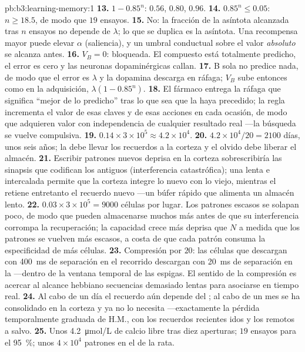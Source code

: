 \begin{solution}{pb:b3:learning-memory:1}
\textbf{13.} $1 - 0.85^{n}$: $0.56$, $0.80$, $0.96$.
\textbf{14.} $0.85^{n} \le 0.05$: $n \ge 18.5$, de modo que $19$ ensayos.
\textbf{15.} No: la fracción de la asíntota alcanzada tras $n$ ensayos
no depende de $\lambda$; lo que se duplica es la asíntota. Una
recompensa mayor puede elevar $\alpha$ (saliencia), y un umbral
conductual sobre el valor \emph{absoluto} se alcanza antes.
\textbf{16.} $V_{B} = 0$: bloqueada. El compuesto está totalmente
predicho, el error es cero y las neuronas dopaminérgicas callan.
\textbf{17.} B sola no predice nada, de modo que el error es $\lambda$ y
la dopamina descarga en ráfaga; $V_{B}$ sube entonces como en la
adquisición, $\lambda(1 -
0.85^{n})$.
\textbf{18.} El fármaco entrega la ráfaga que significa ``mejor de lo
predicho'' tras lo que sea que la haya precedido; la regla incrementa
el valor de esas claves y de esas acciones en cada ocasión, de modo que
adquieren valor con independencia de cualquier resultado real ---la
búsqueda se vuelve compulsiva.
\textbf{19.} $0.14\times 3\times 10^{5} \approx 4.2\times 10^{4}$.
\textbf{20.} $4.2\times 10^{4}/20 = 2100$ días, unos seis años; la
 debe llevar los recuerdos a la corteza y el olvido debe
liberar el almacén.
\textbf{21.} Escribir patrones nuevos deprisa en la corteza
sobrescribiría las sinapsis que codifican los antiguos (interferencia
catastrófica); una  lenta e intercalada permite que la
corteza integre lo nuevo con lo viejo, mientras el  retiene
entretanto el recuerdo nuevo ---un búfer rápido que alimenta un almacén
lento.
\textbf{22.} $0.03\times 3\times 10^{5} = 9000$ células por lugar. Los
patrones escasos se solapan poco, de modo que pueden almacenarse muchos
más antes de que su interferencia corrompa la recuperación; la
capacidad crece más deprisa que $N$ a medida que los patrones se
vuelven más escasos, a costa de que cada patrón consuma la
especificidad de más células.
\textbf{23.} Compresión por $20$: las células que descargan con
\qty{400}{ms} de separación en el recorrido descargan con \qty{20}{ms}
de separación en la  ---dentro de la ventana temporal de
las espigas. El sentido de la compresión es acercar al alcance hebbiano
secuencias demasiado lentas para asociarse en tiempo real.
\textbf{24.} Al cabo de un día el recuerdo aún depende del ; al
cabo de un mes se ha consolidado en la corteza y ya no lo necesita
---exactamente la pérdida temporalmente graduada de H.M., con los
recuerdos recientes idos y los remotos a salvo.
\textbf{25.} Unos \qty{4.2}{\micro mol/L} de calcio libre tras diez
aperturas; $19$ ensayos para el \qty{95}{\%}; unos $4\times 10^{4}$
patrones en el  de la rata.
\end{solution}
